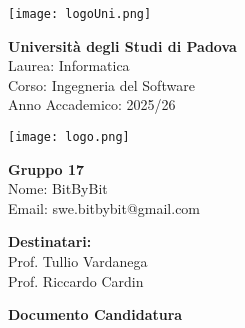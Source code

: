 \documentclass[a4paper,12pt]{article}
\begin{document}
\vspace*{\fill} %

\begin{center}
    \begin{minipage}{0.25\textwidth}
        \centering
        \texttt{[image: logoUni.png]}
    \end{minipage}
    \hfill
    \begin{minipage}{0.7\textwidth}
        \raggedright
        {\color{red}\LARGE \textbf{Università degli Studi di Padova}}\\[0.3cm]
        {\large
        Laurea: Informatica\\
        Corso: Ingegneria del Software\\
        Anno Accademico: 2025/26
        }
    \end{minipage}
\end{center}

\vspace{1cm}

\begin{center}
    \begin{minipage}{0.25\textwidth}
        \centering
        \texttt{[image: logo.png]}
    \end{minipage}
    \hfill
    \begin{minipage}{0.7\textwidth}
        \raggedright
        {\LARGE \textbf{Gruppo 17}}\\[0.3cm]
        {\large
        Nome: BitByBit\\
        Email: swe.bitbybit@gmail.com
        }
    \end{minipage}
\end{center}

\vspace*{1cm}

\begin{flushleft}
\textbf{Destinatari:}\\
Prof. Tullio Vardanega\\
Prof. Riccardo Cardin\\
\end{flushleft}

\vspace{1cm}

\vspace{1.5cm}

\begin{center}
    {\LARGE \textbf{Documento Candidatura}}
\end{center}
\end{document}
